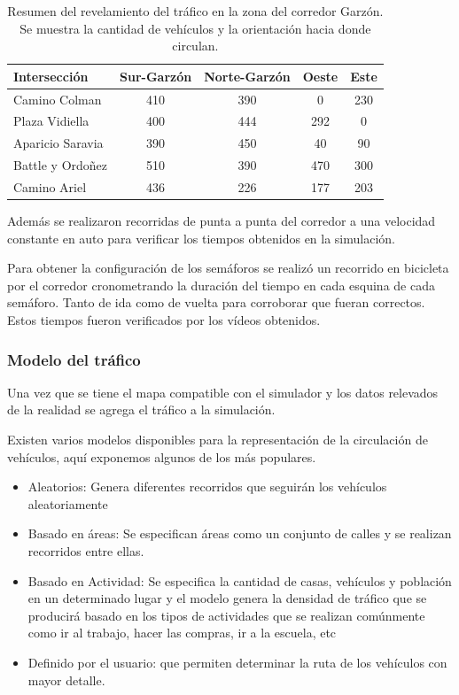 \begin{table}[h]
	\renewcommand{\arraystretch}{1.2}
	\caption{Resumen del revelamiento del tráfico en la zona del corredor Garzón. Se muestra la cantidad de vehículos  y la orientación hacia donde circulan. }
	\label{table:resumen_trafico}
	\centering
	\begin{tabular}{lcccc}
		\hline
		Intersección&
		Sur-Garzón& 
		Norte-Garzón & 
		Oeste &
		Este 
		\\ 
		\hline
		Camino Colman  & 410 & 390 & 0 & 230\\		
		Plaza Vidiella  & 400 & 444 & 292 & 0\\		
		Aparicio Saravia  & 390 & 450 & 40 & 90\\		
		Battle y Ordoñez  & 510 & 390 & 470 & 300 \\	
		Camino Ariel  & 436 & 226 & 177 & 203 \\													
		\hline
		
		
		\hline
	\end{tabular}
\end{table}


Además se realizaron recorridas de punta a punta del corredor a una velocidad constante en auto para verificar los tiempos obtenidos en la simulación.

Para obtener la configuración de los semáforos se realizó un recorrido en bicicleta por el corredor cronometrando la duración del tiempo en cada esquina de cada semáforo. Tanto de ida como de vuelta para corroborar que fueran correctos. Estos tiempos fueron verificados por los vídeos obtenidos.


\newpage
\subsubsection{Modelo del tráfico}
Una vez que se tiene el mapa compatible con el simulador y los datos relevados de la realidad se agrega el tráfico a la simulación.

Existen varios modelos disponibles para la representación de la circulación de vehículos, aquí exponemos algunos de los más populares. 
\begin{itemize}
	\item Aleatorios: Genera diferentes recorridos que seguirán los vehículos aleatoriamente
	\item Basado en áreas:  Se especifican áreas como un conjunto de calles y se realizan recorridos entre ellas.
	\item Basado en Actividad: Se especifica la cantidad de casas, vehículos y población en un determinado lugar y el modelo genera la densidad de tráfico que se producirá basado en los tipos de actividades que se realizan comúnmente como ir al trabajo, hacer las compras, ir a la escuela,  etc
	\item Definido por el usuario: que permiten determinar la ruta de los vehículos con mayor detalle.
\end{itemize}


